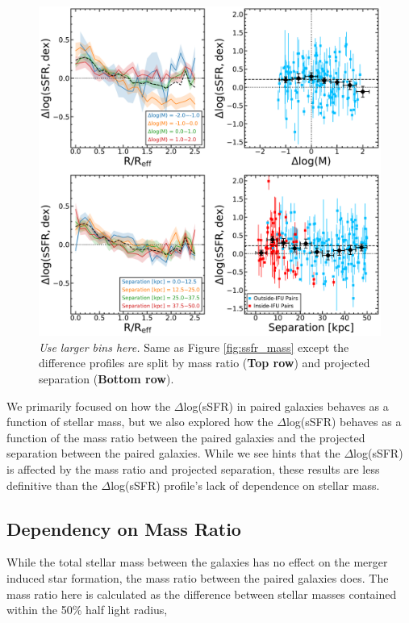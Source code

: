 \documentclass[iop,revtex4,twocolumn,apj,numberedappendix,appendixfloats]{emulateapj}
\begin{document}
\begin{figure}
\centering
\includegraphics[width=\linewidth]{fig/ssfr_partial.pdf}
\caption[]{{\it Use larger bins here.} Same as Figure \ref{fig:ssfr_mass} except the difference profiles are split by mass ratio (\textbf{Top row}) and projected separation (\textbf{Bottom row}). }
\label{fig:ssfr_dmsep}
\end{figure}

We primarily focused on how the $\Delta$log(sSFR) in paired galaxies behaves as a function of stellar mass, but we also explored how the $\Delta$log(sSFR) behaves as a function of the mass ratio between the paired galaxies and the projected separation between the paired galaxies. While we see hints that the $\Delta$log(sSFR) is affected by the mass ratio and projected separation, these results are less definitive than the $\Delta$log(sSFR) profile's lack of dependence on stellar mass. 


\subsection{Dependency on Mass Ratio}
While the total stellar mass between the galaxies has no effect on the merger induced star formation, the mass ratio between the paired galaxies does. The mass ratio here is calculated as the difference between stellar masses contained within the 50\% half light radius, 
\end{document}
